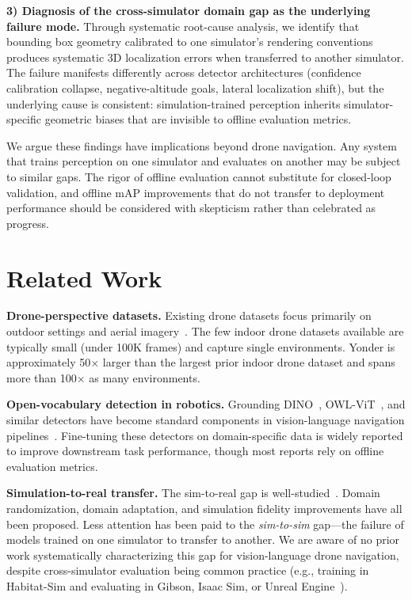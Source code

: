 \documentclass[conference]{IEEEtran}
\begin{document}
\textbf{3) Diagnosis of the cross-simulator domain gap as the underlying failure mode.} Through systematic root-cause analysis, we identify that bounding box geometry calibrated to one simulator's rendering conventions produces systematic 3D localization errors when transferred to another simulator. The failure manifests differently across detector architectures (confidence calibration collapse, negative-altitude goals, lateral localization shift), but the underlying cause is consistent: simulation-trained perception inherits simulator-specific geometric biases that are invisible to offline evaluation metrics.

We argue these findings have implications beyond drone navigation. Any system that trains perception on one simulator and evaluates on another may be subject to similar gaps. The rigor of offline evaluation cannot substitute for closed-loop validation, and offline mAP improvements that do not transfer to deployment performance should be considered with skepticism rather than celebrated as progress.

\section{Related Work}

\textbf{Drone-perspective datasets.} Existing drone datasets focus primarily on outdoor settings and aerial imagery~\cite{du2018unmanned}. The few indoor drone datasets available are typically small (under 100K frames) and capture single environments. Yonder is approximately 50$\times$ larger than the largest prior indoor drone dataset and spans more than 100$\times$ as many environments.

\textbf{Open-vocabulary detection in robotics.} Grounding DINO~\cite{liu2024grounding}, OWL-ViT~\cite{minderer2023scaling}, and similar detectors have become standard components in vision-language navigation pipelines~\cite{huang2025vlmaps,chaplot2020learning}. Fine-tuning these detectors on domain-specific data is widely reported to improve downstream task performance, though most reports rely on offline evaluation metrics.

\textbf{Simulation-to-real transfer.} The sim-to-real gap is well-studied~\cite{tobin2017domain,sadeghi2017cad2rl}. Domain randomization, domain adaptation, and simulation fidelity improvements have all been proposed. Less attention has been paid to the \textit{sim-to-sim} gap---the failure of models trained on one simulator to transfer to another. We are aware of no prior work systematically characterizing this gap for vision-language drone navigation, despite cross-simulator evaluation being common practice (e.g., training in Habitat-Sim and evaluating in Gibson, Isaac Sim, or Unreal Engine~\cite{savva2019habitat,jacinto2024pegasus}).
\end{document}
